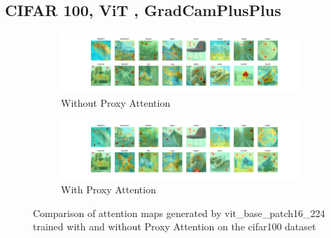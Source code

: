 \subsection{CIFAR 100, ViT , GradCamPlusPlus}

\begin{figure}[!htb]
    \centering
    \begin{subfigure}[b]{1\textwidth}
        \includegraphics[width=\textwidth]{images/cifar100_vit_base_patch16_224_noproxy_1.pdf}
        \caption{Without Proxy Attention}
    \end{subfigure}
    \hfill
    \begin{subfigure}[b]{1\textwidth}
        \includegraphics[width=\textwidth]{images/cifar100_vit_base_patch16_224_proxy_1.pdf}
        \caption{With Proxy Attention}
    \end{subfigure}
    \caption{Comparison of attention maps generated by vit\_base\_patch16\_224 trained with and without Proxy Attention on the cifar100 dataset}
\end{figure}


